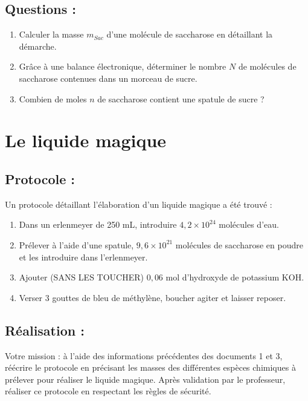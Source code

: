 \documentclass[a4paper,11pt,fleqn]{article}%
\begin{document}
	\subsection*{Questions : }
	\begin{enumerate}
		\item Calculer la masse $m_{Sac}$ d'une molécule de saccharose en détaillant la démarche.\\
		\item Grâce à une balance électronique, déterminer le nombre $N$ de molécules de saccharose contenues dans un morceau de sucre.\\
		\item Combien de moles $n$ de saccharose contient une spatule de sucre ?\\
	\end{enumerate}
\section{Le liquide magique}
	\subsection*{Protocole :}
Un protocole détaillant l'élaboration d'un liquide magique a été trouvé :
\begin{enumerate}
	\item Dans un erlenmeyer de 250 mL, introduire $4,2 \times 10^{24}$ molécules d'eau.
	\item Prélever à l'aide d'une spatule, $9,6 \times 10^{21}$ molécules de saccharose en poudre et les introduire dans l'erlenmeyer.
	\item Ajouter (SANS LES TOUCHER) $0,06$ mol d'hydroxyde de potassium KOH.
	\item Verser 3 gouttes de bleu de méthylène, boucher agiter et laisser reposer.
\end{enumerate}
	\subsection*{Réalisation :}
Votre mission : à l'aide des informations précédentes des documents 1 et 3, réécrire le protocole en précisant les masses des différentes espèces chimiques à prélever pour réaliser le liquide magique. Après validation par le professeur, réaliser ce protocole en respectant les règles de sécurité.\\
\end{document}
